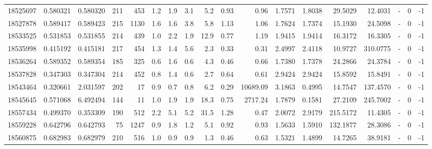 \begin{tabular}{rrrrrrrrrrrrrrrlrr}
  18525697 & 0.580321 &   0.580320 &  211 &  453 &      1.2 &      1.9 &     3.1 &      5.2 &       0.93 &        0.96 &  1.7571 &  1.8038 &   29.5029 &   12.4031 &             - &        0 &         -1 \\
  18527878 & 0.589417 &   0.589423 &  215 & 1130 &      1.6 &      1.6 &     3.8 &      5.8 &       1.13 &        1.06 &  1.7624 &  1.7374 &   15.1930 &   24.5098 &             - &        0 &         -1 \\
  18533525 & 0.531853 &   0.531855 &  214 &  439 &      1.0 &      2.2 &     1.9 &     12.9 &       0.77 &        1.19 &  1.9415 &  1.9414 &   16.3172 &   16.3305 &             - &        0 &         -1 \\
  18535998 & 0.415192 &   0.415181 &  217 &  454 &      1.3 &      1.4 &     5.6 &      2.3 &       0.33 &        0.31 &  2.4997 &  2.4118 &   10.9727 &  310.0775 &             - &        0 &         -1 \\
  18536264 & 0.589352 &   0.589354 &  185 &  325 &      0.6 &      1.6 &     0.6 &      4.3 &       0.46 &        0.66 &  1.7380 &  1.7378 &   24.2866 &   24.3784 &             - &        0 &         -1 \\
  18537828 & 0.347303 &   0.347304 &  214 &  452 &      0.8 &      1.4 &     0.6 &      2.7 &       0.64 &        0.61 &  2.9424 &  2.9424 &   15.8592 &   15.8491 &             - &        0 &         -1 \\
  18543464 & 0.320661 &   2.031597 &  202 &   17 &      0.9 &      0.7 &     0.8 &      6.2 &       0.29 &    10689.09 &  3.1863 &  0.4995 &   14.7547 &  137.4570 &             - &        0 &         -1 \\
  18545645 & 0.571068 &   6.492494 &  144 &   11 &      1.0 &      1.9 &     1.9 &     18.3 &       0.75 &     2717.24 &  1.7879 &  0.1581 &   27.2109 &  245.7002 &             - &        0 &         -1 \\
  18557434 & 0.499370 &   0.353309 &  190 &  512 &      2.2 &      5.1 &     5.2 &     31.5 &       1.28 &        0.47 &  2.0072 &  2.9179 &  215.5172 &   11.4305 &             - &        0 &         -1 \\
  18559228 & 0.642796 &   0.642793 &   75 & 1247 &      0.9 &      1.8 &     1.2 &      5.1 &       0.92 &        0.93 &  1.5633 &  1.5910 &  132.1877 &   28.3086 &             - &        0 &         -1 \\
  18560875 & 0.682983 &   0.682979 &  210 &  516 &      1.0 &      0.9 &     0.9 &      1.3 &       0.46 &        0.63 &  1.5321 &  1.4899 &   14.7265 &   38.9181 &             - &        0 &         -1 \\

\end{tabular}
